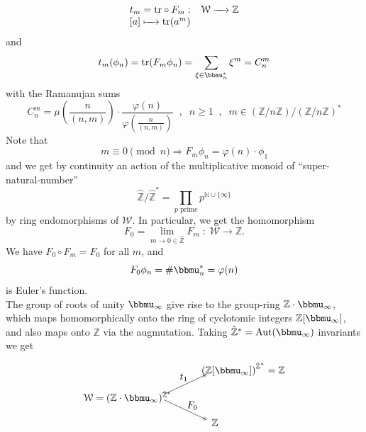 \documentclass[leqno]{article}
\newcommand{\N}{\mathbb{N}}
\newcommand{\Z}{\mathbb{Z}}
\numberwithin{equation}{section}
\begin{document}
\begin{equation}
  \label{eq:12.24}
  \begin{array}[h]{ll}
    t_m=\text{tr}\circ F_m : & \mathcal{W}\xrightarrow{\quad} \Z \\
    \text{$[a]$}\xmapsto{\quad} \text{tr}(a^m)
  \end{array}
\end{equation}
and
\begin{equation}
  \label{eq:12.25}
  t_m(\phi_n) = \text{tr}(F_m\phi_n)=\sum_{\xi\in\bbmu_n^{\ast}}\xi^m=C_n^m
\end{equation}
with the Ramanujan sums
\begin{equation}
  \label{eq:12.26}
  C_n^m= \mu \left(\frac{n}{(n,m)}\right)\cdot \frac{\varphi(n)}{\varphi(\frac{n}{(n,m)})} \;\; , \; \; n\geq 1 \;\; , \;\; m\in
  \left(\Z/n\Z\right)/\left(\Z/n\Z\right)^{\ast}
\end{equation}
Note that 
\begin{equation}
  \label{eq:12.27}
  m \equiv 0 \pmod {n} \Longrightarrow F_m\phi_n= \varphi(n)\cdot \phi_1
\end{equation}
and we get by continuity an action of the multiplicative monoid of ``super-natural-number''
\begin{equation}
  \label{eq:12.28}
  \hat{\Z}/\hat{\Z}^{\ast}=\prod_{p \text{ prime}}p^{\N\cup \{\infty\} }
\end{equation}
by ring endomorphisms of $\mathcal{W}$. In particular, we get the homomorphism
\begin{equation}
  \label{eq:12.29}
  F_0=\lim_{m\to 0\in\hat{\Z}}F_m\; : \; \mathcal{W}\longrightarrow \Z. 
\end{equation}
We have $F_0\circ F_m=F_0$ for all $m$, and
\begin{equation}
  \label{eq:12.30}
  F_0\phi_n = \# \bbmu_n^{\ast}=\varphi(n)
\end{equation}
is Euler's function. \vspace{.1cm}\\
The group of roots of unity $\bbmu_\infty$ give rise to the group-ring $\Z\cdot\bbmu_\infty$, which maps homomorphically onto the ring of cyclotomic integers $\Z[\bbmu_\infty]$, and also maps onto $\Z$ via the augmutation. Taking $\hat{\Z}^*=\text{Aut}(\bbmu_\infty)$ invariants we get
\begin{equation}
  \label{eq:13.18}
  \begin{aligned}
  \begin{tikzpicture}[baseline=0mm]
    \node at (12mm,15mm) {$\mathcal{W}=(\Z\cdot \bbmu_\infty)^{\hat{\Z}^*}$};
    \draw[->>] (25mm,16mm)--(40mm,23mm);
    \draw[->>] (25mm,14mm)--(40mm,7mm);
    \node at (32mm,22mm) {$t_1$};
    \node at (35mm,12mm) {$F_0$};
    \node at (43mm,6mm) {$\Z$};
    \node at (53mm,25mm) {$\left(\Z[\bbmu_\infty]\right)^{\hat{\Z}^*}=\Z$};
  \end{tikzpicture}
    \end{aligned}
\end{equation}
\end{document}
